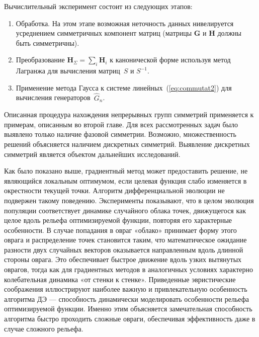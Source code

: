 Вычислительный эксперимент состоит из следующих этапов:
\begin{enumerate}
  \item Обработка. На этом этапе возможная неточность данных нивелируется усреднением симметричных компонент матриц (матрицы $\textbf{G}$ и $\textbf{H}$ должны быть симметричны).
  \item %
  Преобразование $ {\textbf{H}}_{\Sigma} = \sum_{i} \textbf{H}_i$ к канонической форме используя метод Лагранжа для вычисления матриц~$S$ и $S^{-1} $.
  \item Применение метода Гаусса к системе линейных~(\ref{eq:commutat2}) для вычисления генераторов~$\hat{G}_n$.
\end{enumerate}


Описанная процедура нахождения непрерывных групп симметрий применяется к примерам, описанным во второй главе. Для всех рассмотренных задач было выявлено только наличие фазовой симметрии. Возможно, множественность решений объясняется наличием дискретных симметрий. Выявление дискретных симметрий является объектом дальнейших исследований.

Как было показано выше, градиентный метод может предоставить решение, не являющийся локальным оптимумом, если целевая функция слабо изменяется в окрестности текущей точки. Алгоритм дифференциальной эволюции не подвержен такому поведению.
Эксперименты показывают, что в целом эволюция популяции соответствует динамике случайного облака точек, движущегося как целое вдоль рельефа оптимизируемой функции, повторяя его характерные особенности. В случае попадания в овраг «облако» принимает форму этого оврага и распределение точек становится таким, что математическое ожидание разности двух случайных векторов оказывается направленным вдоль длинной стороны оврага. Это обеспечивает быстрое движение вдоль узких вытянутых оврагов, тогда как для градиентных методов в аналогичных условиях характерно колебательная динамика «от стенки к стенке». Приведенные эвристические соображения иллюстрируют наиболее важную и привлекательную особенность алгоритма ДЭ — способность динамически моделировать особенности рельефа оптимизируемой функции. Именно этим объясняется замечательная способность алгоритма быстро проходить сложные овраги, обеспечивая эффективность даже в случае сложного рельефа.

